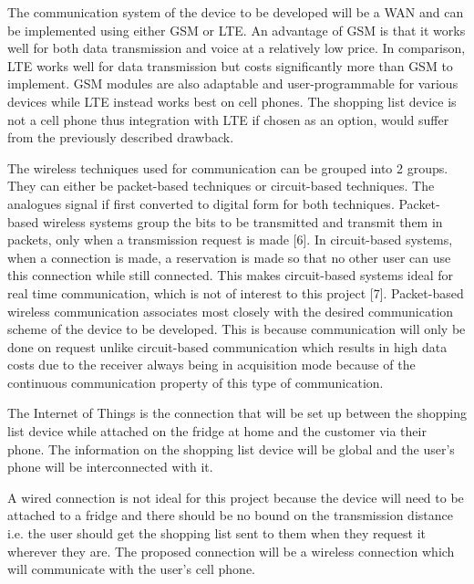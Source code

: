 The communication system of the device to be developed will be a WAN and can be implemented using either GSM or LTE. An advantage of GSM is that it works well for both data transmission and voice at a relatively low price. In comparison, LTE works well for data transmission but costs significantly more than GSM to implement. GSM modules are also adaptable and user-programmable for various devices while LTE instead works best on cell phones. The shopping list device is not a cell phone thus integration with LTE if chosen as an option, would suffer from the previously described drawback.

The wireless techniques used for communication can be grouped into 2 groups. They can either be packet-based techniques or circuit-based techniques. The analogues signal if first converted to digital form for both techniques. Packet-based wireless systems group the bits to be transmitted and transmit them in packets, only when a transmission request is made [6]. In circuit-based systems, when a connection is made, a reservation is made so that no other user can use this connection while still connected. This makes circuit-based systems ideal for real time communication, which is not of interest to this project [7]. Packet-based wireless communication associates most closely with the desired communication scheme of the device to be developed. This is because communication will only be done on request unlike circuit-based communication which results in high data costs due to the receiver always being in acquisition mode because of the continuous communication property of this type of communication.

The Internet of Things is the connection that will be set up between the shopping list device while attached on the fridge at home and the customer via their phone. The information on the shopping list device will be global and the user’s phone will be interconnected with it.

A wired connection is not ideal for this project because the device will need to be attached to a fridge and there should be no bound on the transmission distance i.e. the user should get the shopping list sent to them when they request it wherever they are. The proposed connection will be a wireless connection which will communicate with the user’s cell phone. 

\newpage




